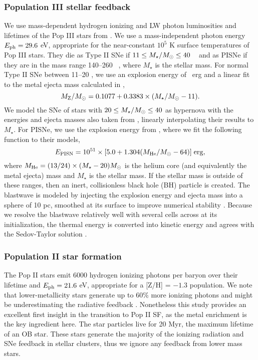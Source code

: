 \documentclass[12pt,preprint]{aastex}
\begin{document}
\subsubsection{Population III stellar feedback}

We use mass-dependent hydrogen ionizing and LW photon luminosities and
lifetimes of the Pop III stars from \citet{Schaerer02}.  We use a
mass-independent photon energy $E_{\rm ph} = 29.6$ eV, appropriate for
the near-constant $10^5$ K surface temperatures of Pop III stars.
They die as Type II SNe if $11 \le M_\star/\Ms \le 40$
\Ms~\citep{Woosley95} and as PISNe if they are in the mass range
140--260 \Ms~\citep{Heger03}, where $M_\star$ is the stellar mass.
For normal Type II SNe between 11--20 \Ms, we use an explosion energy
of ~erg and a linear fit to the metal ejecta mass calculated
in \citet{Nomoto06},
%
\begin{equation}
  \label{eqn:typeii}
  M_{\rm Z}/\Ms = 0.1077 + 0.3383 \times (M_\star/\Ms - 11).
\end{equation}
%
We model the SNe of stars with $20 \le M_\star/\Ms \le 40$ as
hypernova with the energies and ejecta masses also taken from
\citeauthor{Nomoto06}, linearly interpolating their results to
$M_\star$.  For PISNe, we use the explosion energy from
\citet{Heger02}, where we fit the following function to their models,
%
\begin{equation}
  \label{eqn:pisn}
  E_{\rm PISN} = 10^{51} \times [5.0 + 1.304 (M_{\rm He}/\Ms - 64)] \;
  \mathrm{erg},
\end{equation}
%
where $M_{\rm He} = (13/24) \times (M_\star - 20) \Ms$ is the helium
core (and equivalently the metal ejecta) mass and $M_\star$ is the
stellar mass.  If the stellar mass is outside of these ranges, then an
inert, collisionless black hole (BH) particle is created.  The
blastwave is modeled by injecting the explosion energy and ejecta mass
into a sphere of 10 pc, smoothed at its surface to improve numerical
stability \citep{Wise08_Gal}.  Because we resolve the blastwave
relatively well with several cells across at its initialization, the
thermal energy is converted into kinetic energy and agrees with the
Sedov-Taylor solution \citep[e.g.][]{Greif07}.

\subsubsection{Population II star formation}

The Pop II stars emit 6000 hydrogen ionizing photons per baryon over
their lifetime and $E_{\rm ph} = 21.6$ eV, appropriate for a [Z/H] =
$-1.3$ population.  We note that lower-metallicity stars generate up
to 60\% more ionizing photons and might be underestimating the
radiative feedback \citep{Schaerer03}.  Nonetheless this study
provides an excellent first insight in the transition to Pop II SF, as
the metal enrichment is the key ingredient here.  The star particles
live for 20 Myr, the maximum lifetime of an OB star.  These stars
generate the majority of the ionizing radiation and SNe feedback in
stellar clusters, thus we ignore any feedback from lower mass stars.
\end{document}
